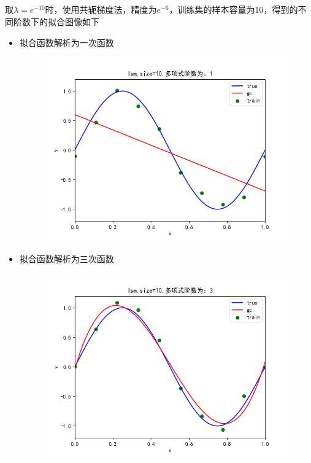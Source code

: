 \documentclass[lang=cn,a4paper,cite=authoryear]{elegantpaper}
\begin{document}
\subsection*{}
取$\lambda =e^{-10}$时，使用共轭梯度法，精度为$e^{-6}$，训练集的样本容量为10，得到的不同阶数下的拟合图像如下
\begin{itemize}
	\item 拟合函数解析为一次函数
	\begin{figure}[H]
		\centering
		\includegraphics[scale=0.5]{gc1}
	\end{figure}
	\item 拟合函数解析为三次函数
	\begin{figure}[H]
		\centering
		\includegraphics[scale=0.5]{gc3}

\end{figure}
\end{itemize}
\end{document}

